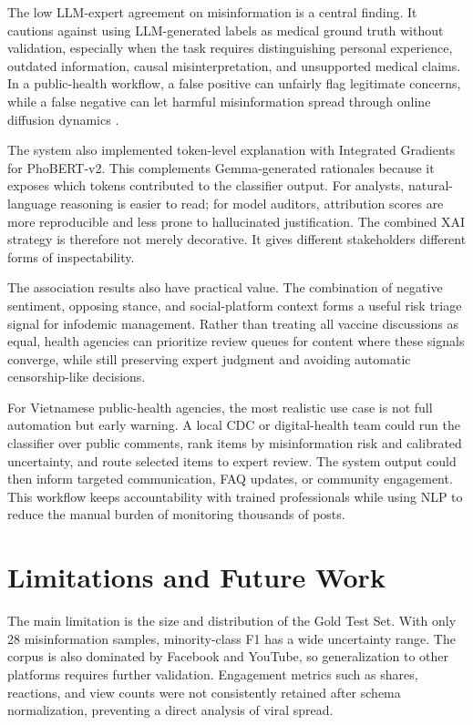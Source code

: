 \documentclass[runningheads]{llncs}
\begin{document}
The low LLM-expert agreement on misinformation is a central finding. It cautions against using LLM-generated labels as medical ground truth without validation, especially when the task requires distinguishing personal experience, outdated information, causal misinterpretation, and unsupported medical claims. In a public-health workflow, a false positive can unfairly flag legitimate concerns, while a false negative can let harmful misinformation spread through online diffusion dynamics \cite{vosoughi2018spread}.

The system also implemented token-level explanation with Integrated Gradients for PhoBERT-v2. This complements Gemma-generated rationales because it exposes which tokens contributed to the classifier output. For analysts, natural-language reasoning is easier to read; for model auditors, attribution scores are more reproducible and less prone to hallucinated justification. The combined XAI strategy is therefore not merely decorative. It gives different stakeholders different forms of inspectability.

The association results also have practical value. The combination of negative sentiment, opposing stance, and social-platform context forms a useful risk triage signal for infodemic management. Rather than treating all vaccine discussions as equal, health agencies can prioritize review queues for content where these signals converge, while still preserving expert judgment and avoiding automatic censorship-like decisions.

For Vietnamese public-health agencies, the most realistic use case is not full automation but early warning. A local CDC or digital-health team could run the classifier over public comments, rank items by misinformation risk and calibrated uncertainty, and route selected items to expert review. The system output could then inform targeted communication, FAQ updates, or community engagement. This workflow keeps accountability with trained professionals while using NLP to reduce the manual burden of monitoring thousands of posts.

\section{Limitations and Future Work}
The main limitation is the size and distribution of the Gold Test Set. With only 28 misinformation samples, minority-class F1 has a wide uncertainty range. The corpus is also dominated by Facebook and YouTube, so generalization to other platforms requires further validation. Engagement metrics such as shares, reactions, and view counts were not consistently retained after schema normalization, preventing a direct analysis of viral spread.
\end{document}
